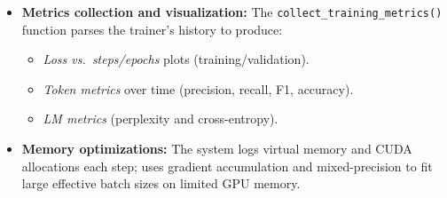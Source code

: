 \documentclass[../main.tex]{subfiles}
\begin{document}
\begin{itemize}
  \item \textbf{Metrics collection and visualization:}  
    The \texttt{collect\_training\_metrics()} function parses the trainer’s history to produce:
    \begin{itemize}
      \item \emph{Loss vs.\ steps/epochs} plots (training/validation).  
      \item \emph{Token metrics} over time (precision, recall, F1, accuracy).  
      \item \emph{LM metrics} (perplexity and cross-entropy).
    \end{itemize}

  \item \textbf{Memory optimizations:}  
    The system logs virtual memory and CUDA allocations each step; uses gradient accumulation and mixed-precision to fit large effective batch sizes on limited GPU memory.
\end{itemize}
\end{document}
